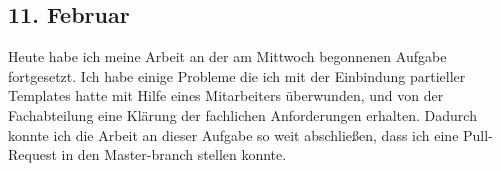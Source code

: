 \subsection{11. Februar}
Heute habe ich meine Arbeit an der am Mittwoch begonnenen Aufgabe fortgesetzt. Ich habe einige Probleme die ich mit der Einbindung partieller Templates hatte mit Hilfe eines Mitarbeiters überwunden, und von der Fachabteilung eine Klärung der fachlichen Anforderungen erhalten. Dadurch konnte ich die Arbeit an dieser Aufgabe so weit abschließen, dass ich eine Pull-Request in den Master-branch stellen konnte. 